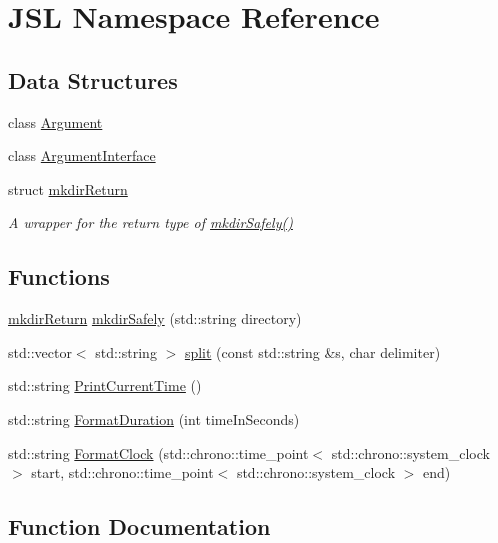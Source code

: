 \hypertarget{namespaceJSL}{}\section{J\+SL Namespace Reference}
\label{namespaceJSL}
\subsection*{Data Structures}
\begin{DoxyCompactItemize}
\item 
class \hyperlink{classJSL_1_1Argument}{Argument}
\item 
class \hyperlink{classJSL_1_1ArgumentInterface}{Argument\+Interface}
\item 
struct \hyperlink{structJSL_1_1mkdirReturn}{mkdir\+Return}
\begin{DoxyCompactList}\small\item\em A wrapper for the return type of \hyperlink{namespaceJSL_a1db6f26ec58c53d1a56375c0f1b27c77}{mkdir\+Safely()} \end{DoxyCompactList}\end{DoxyCompactItemize}
\subsection*{Functions}
\begin{DoxyCompactItemize}
\item 
\hyperlink{structJSL_1_1mkdirReturn}{mkdir\+Return} \hyperlink{namespaceJSL_a1db6f26ec58c53d1a56375c0f1b27c77}{mkdir\+Safely} (std\+::string directory)
\item 
std\+::vector$<$ std\+::string $>$ \hyperlink{namespaceJSL_a34a7ba28084b304e97a707c653dce887}{split} (const std\+::string \&s, char delimiter)
\item 
std\+::string \hyperlink{namespaceJSL_a22fc26d87034a744e42e70e77db892df}{Print\+Current\+Time} ()
\item 
std\+::string \hyperlink{namespaceJSL_ad7ff2220bbab0294b95b9aa85332a222}{Format\+Duration} (int time\+In\+Seconds)
\item 
std\+::string \hyperlink{namespaceJSL_ae7af96a0311784e019209221335f76d9}{Format\+Clock} (std\+::chrono\+::time\+\_\+point$<$ std\+::chrono\+::system\+\_\+clock $>$ start, std\+::chrono\+::time\+\_\+point$<$ std\+::chrono\+::system\+\_\+clock $>$ end)
\end{DoxyCompactItemize}


\subsection{Function Documentation}
\mbox{\label{namespaceJSL_ae7af96a0311784e019209221335f76d9}} 
